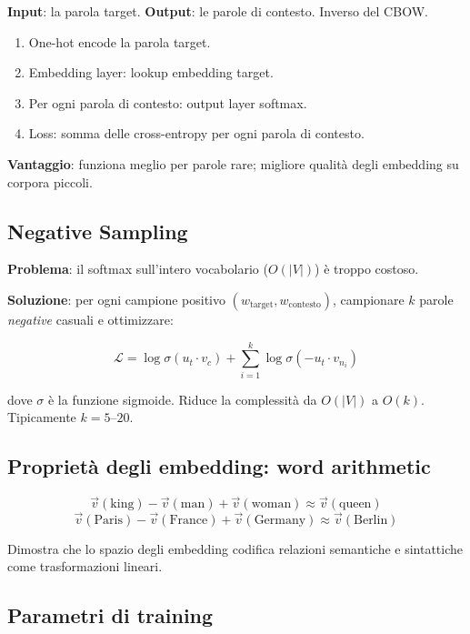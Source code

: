 \documentclass[12pt,a4paper]{article}
\begin{document}
\textbf{Input}: la parola target. \textbf{Output}: le parole di contesto. Inverso del CBOW.

\begin{enumerate}[leftmargin=1.5em, label=\arabic*.]
  \item One-hot encode la parola target.
  \item Embedding layer: lookup embedding target.
  \item Per ogni parola di contesto: output layer softmax.
  \item Loss: somma delle cross-entropy per ogni parola di contesto.
\end{enumerate}

\textbf{Vantaggio}: funziona meglio per parole rare; migliore qualità degli embedding su corpora piccoli.

\subsection{Negative Sampling}

\textbf{Problema}: il softmax sull'intero vocabolario ($O(|V|)$) è troppo costoso.

\textbf{Soluzione}: per ogni campione positivo $(w_{\text{target}}, w_{\text{contesto}})$, campionare $k$ parole \emph{negative} casuali e ottimizzare:

\begin{formulabox}
\[
\mathcal{L} = \log \sigma(u_t \cdot v_c) + \sum_{i=1}^{k} \log \sigma(-u_t \cdot v_{n_i})
\]
\end{formulabox}

dove $\sigma$ è la funzione sigmoide. Riduce la complessità da $O(|V|)$ a $O(k)$. Tipicamente $k = 5$--$20$.

\subsection{Proprietà degli embedding: word arithmetic}

\begin{formulabox}
\[
\vec{v}(\text{king}) - \vec{v}(\text{man}) + \vec{v}(\text{woman}) \approx \vec{v}(\text{queen})
\]
\[
\vec{v}(\text{Paris}) - \vec{v}(\text{France}) + \vec{v}(\text{Germany}) \approx \vec{v}(\text{Berlin})
\]
\end{formulabox}

Dimostra che lo spazio degli embedding codifica relazioni semantiche e sintattiche come trasformazioni lineari.

\subsection{Parametri di training}
\end{document}
